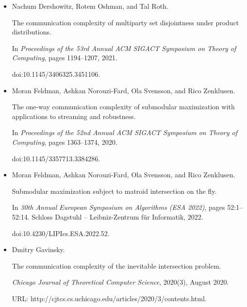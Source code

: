 \documentclass[10pt,a4paper]{article}
\begin{document}
\begin{itemize}
doi:10.4230/LIPIcs.FSTTCS.2023.24.





\item[] 
[23]

Nachum Dershowitz, Rotem Oshman, and Tal Roth.


The communication complexity of multiparty set disjointness under
product distributions.


In \emph{Proceedings of the 53rd Annual ACM SIGACT Symposium on Theory
of Computing}, pages 1194–1207, 2021.


doi:10.1145/3406325.3451106.





\item[] 
[24]

Moran Feldman, Ashkan Norouzi-Fard, Ola Svensson, and Rico Zenklusen.


The one-way communication complexity of submodular maximization with
applications to streaming and robustness.


In \emph{Proceedings of the 52nd Annual ACM SIGACT Symposium on Theory
of Computing}, pages 1363–1374, 2020.


doi:10.1145/3357713.3384286.





\item[] 
[25]

Moran Feldman, Ashkan Norouzi-Fard, Ola Svensson, and Rico Zenklusen.


Submodular maximization subject to matroid intersection on the fly.


In \emph{30th Annual European Symposium on Algorithms (ESA 2022)},
pages 52:1–52:14. Schloss Dagstuhl – Leibniz-Zentrum für Informatik,
2022.


doi:10.4230/LIPIcs.ESA.2022.52.





\item[] 
[26]

Dmitry Gavinsky.


The communication complexity of the inevitable intersection problem.


\emph{Chicago Journal of Theoretical Computer Science}, 2020(3),
August 2020.


URL:
http://cjtcs.cs.uchicago.edu/articles/2020/3/contents.html.






\end{itemize}
\end{document}
